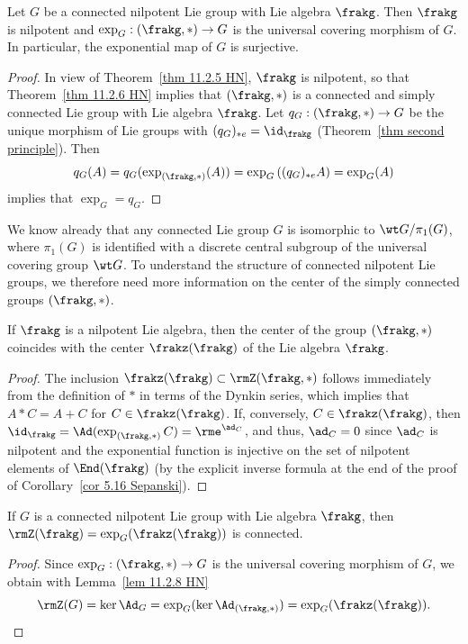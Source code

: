 \begin{cor}[{\cite[Cor.~11.2.7]{HN}}]
    Let $G$ be a connected nilpotent Lie group with Lie algebra $\frakg$. Then $\frakg$ is nilpotent and $\exp_G:(\frakg,\ast)\to G$ is the universal covering morphism of $G$. In particular, the exponential map of $G$ is surjective.
\end{cor}
\begin{proof}
    In view of Theorem~\ref{thm 11.2.5 HN}, $\frakg$ is nilpotent, so that Theorem~\ref{thm 11.2.6 HN} implies that $(\frakg,\ast)$ is a connected and simply connected Lie group with Lie algebra $\frakg$. Let $q_G:(\frakg,\ast)\to G$ be the unique morphism of Lie groups with $(q_G)_{\ast e}=\id_\frakg$ (Theorem~\ref{thm second principle}). Then 
    \[q_G(A)=q_G(\exp_{(\frakg,\ast)}(A))=\exp_G\left((q_G)_{\ast e}A\right)=\exp_G(A)\]
    implies that $\exp_G=q_G$.
\end{proof}

We know already that any connected Lie group $G$ is isomorphic to $\wt G\slash \pi_1(G)$, where $\pi_1(G)$ is identified with a discrete central subgroup of the universal covering group $\wt G$. To understand the structure of connected nilpotent Lie groups, we therefore need more information on the center of the simply connected groups $(\frakg,\ast)$.

\begin{lem}[{\cite[Lem.~11.2.8]{HN}}]\label{lem 11.2.8 HN}
    If $\frakg$ is a nilpotent Lie algebra, then the center of the group $(\frakg,\ast)$ coincides with the center $\frakz(\frakg)$ of the Lie algebra $\frakg$.
\end{lem}
\begin{proof}
    The inclusion $\frakz(\frakg)\subset \rmZ(\frakg,\ast)$ follows immediately from the definition of $\ast$ in terms of the Dynkin series, which implies that $A\ast C=A+C$ for $C\in\frakz(\frakg)$. If, conversely, $C\in\frakz(\frakg)$, then $\id_\frakg=\Ad(\exp_{(\frakg,\ast)}C)=\rme^{\ad_C}$, and thus, $\ad_C=0$ since $\ad_C$ is nilpotent and the exponential function is injective on the set of nilpotent elements of $\End(\frakg)$ (by the explicit inverse formula at the end of the proof of Corollary~\ref{cor 5.16 Sepanski}).
\end{proof}

\begin{prop}[{\cite[Prop.~11.2.9]{HN}}]
    If $G$ is a connected nilpotent Lie group with Lie algebra $\frakg$, then $\rmZ(\frakg)=\exp_G(\frakz(\frakg))$ is connected.
\end{prop}
\begin{proof}
    Since $\exp_G:(\frakg,\ast)\to G$ is the universal covering morphism of $G$, we obtain with Lemma~\ref{lem 11.2.8 HN} 
    \[\rmZ(G)=\ker\Ad_G=\exp_G(\ker \Ad_{(\frakg,\ast)})=\exp_G(\frakz(\frakg)).\]
\end{proof}

